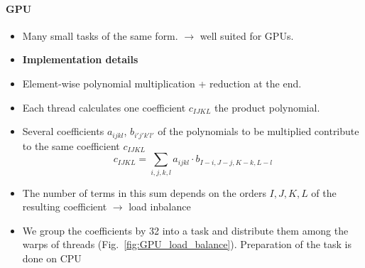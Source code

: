 \documentclass[oribibl]{llncs2e/llncs}
\begin{document}
\paragraph{GPU}
\begin{itemize}
\item Many small tasks of the same form. $\rightarrow$ well suited for GPUs.
\item {\bf Implementation details}
\item Element-wise polynomial multiplication + reduction at the end.
\item Each thread calculates one coefficient $c_{IJKL}$ the product polynomial.
\item Several coefficients $a_{ijkl}$, $b_{i'j'k'l'}$ of the polynomials to be multiplied contribute to the same coefficient $c_{IJKL}$
\begin{equation}
    c_{IJKL} = \sum_{i,j,k,l} a_{ijkl} \cdot b_{I-i,J-j,K-k,L-l}
\end{equation}
\item The number of terms in this sum depends on the orders $I,J,K,L$ of the resulting coefficient $\rightarrow$ load inbalance
\item We group the coefficients by 32 into a task and distribute them among the warps of threads (Fig.\ \ref{fig:GPU_load_balance}).
{\color{blue} Preparation of the task is done on CPU}


\end{itemize}
\end{document}
